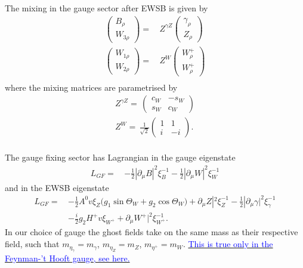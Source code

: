 \documentclass[11pt]{article}
\begin{document}
The mixing in the gauge sector after EWSB is given by
\begin{align} 
\left(\begin{array}{c} 
B_{{\rho}}\\ 
W_{{3 \rho}}\end{array} \right) 
 = & \,Z^{\gamma Z}
\left(\begin{array}{c} 
\gamma_{{\rho}}\\ 
Z_{{\rho}}\end{array} \right) \\ 
\left(\begin{array}{c} 
W_{{1 \rho}}\\ 
W_{{2 \rho}}\end{array} \right) 
 = & \,Z^{W}
\left(\begin{array}{c} 
W^+_{{\rho}}\\ 
W^+_{{\rho}}\end{array} \right) \\ 
\end{align} 
where the mixing matrices are parametrised by \\ 
\begin{align} 
Z^{\gamma Z}= \, \left( 
\begin{array}{cc} 
c_W  & - s_W   \\ 
 s_W  & c_W \end{array} 
\right) \\ 
Z^{W}= \,\frac{1}{\sqrt{2}}  \left( 
\begin{array}{cc} 
1& 1 \\ 
 i   & -i  \end{array} 
\right). \\ 
\end{align} 

The gauge fixing sector has Lagrangian in the gauge eigenstate
\begin{align} 
L_{GF} = \, &-\frac{1}{2} |\partial_{\mu}B|^2 \xi_{B}^{-1}  -\frac{1}{2} |\partial_{\mu}W|^2 \xi_{W}^{-1} 
\end{align} 
and in the EWSB eigenstate
\begin{align} 
L_{GF} = \, & -\frac{1}{2} A^0 v \xi_{Z} \Big(g_1 \sin\Theta_W   + g_2 \cos\Theta_W  \Big) + \partial_{\mu}Z|^2 \xi_{Z}^{-1}  -\frac{1}{2} |\partial_{\mu}\gamma|^2 \xi_{\gamma}^{-1} \\&-\frac{i}{2} g_2 H^+ v \xi_{W^+}  + \partial_{\mu}W^+|^2 \xi_{W^+}^{-1}.
\end{align} 
In our choice of gauge the ghost fields take on the same mass as their respective field, such that $m_{\eta_{\gamma}} = m_{\gamma}$, $m_{\eta_Z}=m_{Z}$, $m_{\eta^+}=m_{W}$.   \href{https://en.wikipedia.org/wiki/Faddeev\%E2\%80\%93Popov_ghost}{\textcolor{blue}{This is true only in the Feynman-'t Hooft gauge, see here.}}\\
\end{document}
